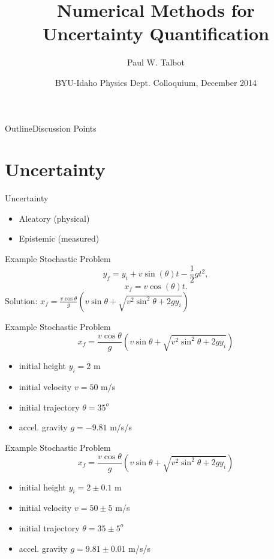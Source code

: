 \documentclass{beamer}
\title[Numerical UQ Methods] %
{Numerical Methods for Uncertainty Quantification}
\author[Talbot] %
{Paul W. Talbot\inst{1}}
\institute[University of New Mexico] %
{
  \inst{1}%
  University of New Mexico\\
   \vspace{10pt}
\footnotesize{Supported by Idaho National Laboratory}
}
\date[BYU-I, 2014] %
{BYU-Idaho Physics Dept. Colloquium, December 2014}
\begin{document}
\begin{frame}
  \titlepage
\end{frame}

\begin{frame}{Outline}{Discussion Points}
  \tableofcontents[pausesections]
\end{frame}

\section{Uncertainty}
\begin{frame}{Uncertainty}
\begin{itemize}
\item Aleatory (physical)
\item Epistemic (measured)
\end{itemize}
\end{frame}

\begin{frame}{Example Stochastic Problem}\vspace{-30pt}
\begin{equation}
y_f=y_i + v\sin(\theta)t - \frac{1}{2}gt^2,
\end{equation}
\begin{equation}
x_f=v\cos(\theta)t.
\end{equation}\vspace{-10pt}
Solution: $x_f=\frac{v\cos{\theta}}{g}\left(v\sin\theta+\sqrt{v^2\sin^2\theta + 2gy_i}\right)$
\end{frame}

\begin{frame}{Example Stochastic Problem}\vspace{-50pt}
\begin{equation}
x_f=\frac{v\cos{\theta}}{g}\left(v\sin\theta+\sqrt{v^2\sin^2\theta + 2gy_i}\right)
\end{equation}
\begin{itemize}
\item initial height $y_i = 2$ m
\item initial velocity $v = 50$ m/s
\item initial trajectory $\theta = 35^o$
\item accel. gravity $g = -9.81$ m/s/s
\end{itemize}
\end{frame}

\begin{frame}{Example Stochastic Problem}\vspace{-50pt}
\begin{equation}
x_f=\frac{v\cos{\theta}}{g}\left(v\sin\theta+\sqrt{v^2\sin^2\theta + 2gy_i}\right)
\end{equation}
\begin{itemize}
\item initial height $y_i = 2\pm0.1$ m
\item initial velocity $v = 50\pm5$ m/s
\item initial trajectory $\theta = 35\pm5^o$
\item accel. gravity $g = 9.81 \pm0.01$ m/s/s
\end{itemize}
\end{frame}
\end{document}
